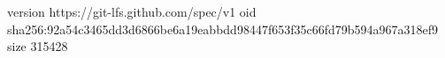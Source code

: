 version https://git-lfs.github.com/spec/v1
oid sha256:92a54c3465dd3d6866be6a19eabbdd98447f653f35c66fd79b594a967a318ef9
size 315428
